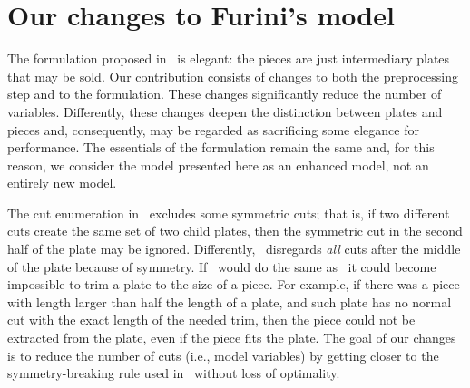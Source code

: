 \documentclass[smallextended]{svjour3}       %
\begin{document}
\section{Our changes to Furini's model}
\label{sec:enhanced_model}


The formulation proposed in~\cite{furini:2016} is elegant: the pieces are just intermediary plates that may be sold.
Our contribution consists of changes to both the preprocessing step and to the formulation.
These changes significantly reduce the number of variables.
Differently, these changes deepen the distinction between plates and pieces and, consequently, may be regarded as sacrificing some elegance for performance.
The essentials of the formulation remain the same and, for this reason, we consider the model presented here as an enhanced model, not an entirely new model.


The cut enumeration in~\cite{furini:2016} excludes some symmetric cuts; that is, if two different cuts create the same set of two child plates, then the symmetric cut in the second half of the plate may be ignored.
Differently,~\cite{nicos:1977} disregards \emph{all} cuts after the middle of the plate because of symmetry.
If~\cite{furini:2016} would do the same as~\cite{nicos:1977} it could become impossible to trim a plate to the size of a piece.
For example, if there was a piece with length larger than half the length of a plate, and such plate has no normal cut with the exact length of the needed trim, then the piece could not be extracted from the plate, even if the piece fits the plate.
The goal of our changes is to reduce the number of cuts (i.e., model variables) by getting closer to the symmetry-breaking rule used in~\cite{nicos:1977} without loss of optimality.
\end{document}
